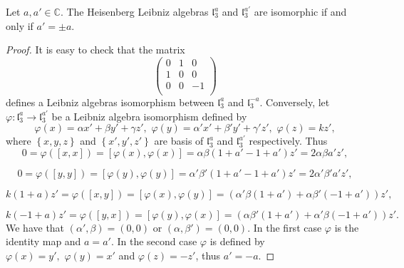 \documentclass[10pt,a4paper]{amsart}
\begin{document}
\begin{prop}
	Let $a,a'\in\mathbb{C}$. The Heisenberg Leibniz algebras $\mathfrak{l}_3^a$ and $\mathfrak{l}_3^{a'}$ are isomorphic if and only if $a'=\pm a$.
\end{prop}

\begin{proof}
	It is easy to check that the matrix
	 $$
	\begin{pmatrix}
		0 & 1 & 0 \\
		1 & 0 & 0 \\
		0 & 0 & -1 \\
	\end{pmatrix}
	$$
	defines a Leibniz algebras isomorphism between $\mathfrak{l}_3^a$ and $\mathfrak{l}_3^{-a}$. Conversely, let $\varphi \colon \mathfrak{l}_3^a\rightarrow \mathfrak{l}_3^{a'}$ be a Leibniz algebra isomorphism defined by 
	$$
	\varphi(x)=\alpha x'+\beta y'+\gamma z',\,\, \varphi(y)=\alpha' x'+\beta' y'+\gamma' z',\,\, \varphi(z)=kz',
	$$
	where $\left\{x,y,z\right\}$ and $\left\{x',y',z'\right\}$ are basis of $\mathfrak{l}_3^a$ and $\mathfrak{l}_3^{a'}$ respectively. Thus
	\begin{equation*}
		0=\varphi(\left[x,x\right])=\left[\varphi(x),\varphi(x)\right]=\alpha\beta\left( 1+a'-1+
		a' \right)z'=2\alpha\beta a'z',
	\end{equation*}
	
	\begin{equation*}
		0=\varphi(\left[y,y\right])=\left[\varphi(y),\varphi(y)\right]=\alpha'\beta'\left( 1+a'-1+
		a' \right)z'=2\alpha'\beta' a'z',
	\end{equation*}
	
	\begin{equation*}
		k\left(1+a\right)z'=\varphi(\left[x,y\right])=\left[\varphi(x),\varphi(y)\right]=\left( \alpha'\beta\left(1+a'\right)+\alpha\beta'\left(-1+a'\right)\right)z',
	\end{equation*}
	
	\begin{equation*}
		k\left(-1+a\right)z'=\varphi(\left[y,x\right])=\left[\varphi(y),\varphi(x)\right]=\left( \alpha\beta'\left(1+a'\right)+\alpha'\beta\left(-1+a'\right)\right)z'.
	\end{equation*}
	We have that $\left(\alpha',\beta\right)=(0,0)$ or $\left(\alpha,\beta'\right)=(0,0)$. In the first case $\varphi$ is the identity map and $a=a'$. In the second case $\varphi$ is defined by $\varphi(x)=y',\,\, \varphi(y)=x'$ and $\varphi(z)=-z'$, thus $a'=-a$.
\end{proof}
\end{document}
